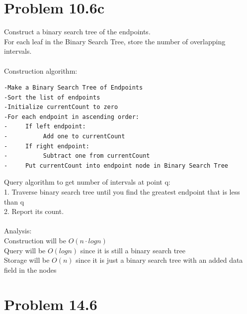 \documentclass[11pt,psfig]{article}
\begin{document}
\section*{Problem 10.6c}
Construct a binary search tree of the endpoints. \\
For each leaf in the Binary Search Tree, store the number of overlapping intervals. \\
\\
Construction algorithm:
\begin{verbatim}
-Make a Binary Search Tree of Endpoints
-Sort the list of endpoints
-Initialize currentCount to zero
-For each endpoint in ascending order:
-     If left endpoint:
-          Add one to currentCount
-     If right endpoint:
-          Subtract one from currentCount
-     Put currentCount into endpoint node in Binary Search Tree
\end{verbatim}
Query algorithm to get number of intervals at point q:\\
1. Traverse binary search tree until you find the greatest endpoint that is less than q\\
2. Report its count. \\
\\
Analysis:\\
Construction will be $O(n \cdot logn)$ \\
Query will be $O(logn)$ since it is still a binary search tree \\
Storage will be $O(n)$ since it is just a binary search tree with an added data field in the nodes
\newpage
\section*{Problem 14.6}
\end{document}
